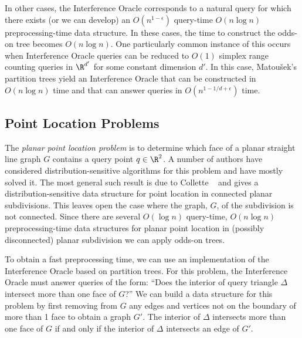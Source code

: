\documentclass{patmorin}
\begin{document}
In other cases, the Interference Oracle corresponds to a natural query for
which there exists (or we can develop) an $O(n^{1-\epsilon})$ query-time
$O(n\log n)$ preprocessing-time data structure.  In these cases, the time
to construct the odds-on tree becomes $O(n\log n)$.  One particularly
common instance of this occurs when Interference Oracle queries can
be reduced to $O(1)$ simplex range counting queries in $\R^{d'}$ for
some constant dimension $d'$.  In this case, Matou\v{s}ek's partition
trees \cite{m92} yield an Interference Oracle that can be constructed in
$O(n\log n)$ time and that can answer queries in $O(n^{1-1/d+\epsilon})$
time. 

\subsection{Point Location Problems}

The \emph{planar point location problem} is to determine which face
of a planar straight line graph $G$ contains a query point $q\in\R^2$.
A number of authors have considered distribution-sensitive algorithms for
this problem \cite{acmr00,amm00,amm01a,amm01b,ammw07,cdilm08,i01,i04}
and have mostly solved it.  The most general such result is due to
Collette \etal\ \cite{cdilm08} and gives a distribution-sensitive
data structure for point location in connected planar subdivisions.
This leaves open the case where the graph, $G$, of the subdivision is not
connected.  Since there are several $O(\log n)$ query-time, $O(n\log n)$
preprocessing-time data structures for planar point location in (possibly
disconnected) planar subdivision \cite{as98,egs86,k83,m90,st86} we can
apply odds-on trees.

To obtain a fast preprocessing time, we can use an
implementation of the Interference Oracle based on partition trees.  For
this problem, the Interference Oracle must answer queries of the form:
``Does the interior of query triangle $\Delta$ intersect more than one face
of $G$?''  We can build a data structure for this problem by first removing
from $G$ any edges and vertices not on the boundary of more than 1 face to
obtain a graph $G'$.  The interior of $\Delta$ intersects more than one
face of $G$ if and only if the interior of $\Delta$ intersects an edge of
$G'$.
\end{document}
